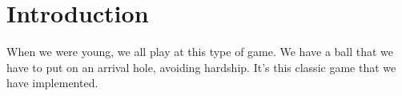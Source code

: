 \section*{Introduction}
When we were young, we all play at this type of game. We have a ball that we have to put on an arrival hole, avoiding hardship. It's this classic game that we have implemented. 